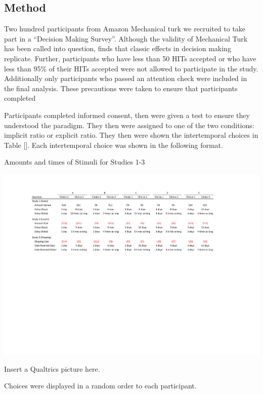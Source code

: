 \documentclass[]{article}
\begin{document}
\subsection{Method}
Two hundred participants from Amazon Mechanical turk we recruited to take part in a ``Decision Making Survey''. 
Although the validity of Mechanical Turk has been called into question,  finds that classic effects in decision making replicate. 
Further, participants who have less than 50 HITs accepted or  who have less than 95\% of their HITs accepted were not allowed to participate in the study. 
Additionally only participants who passed an attention check were included in the final analysis.
These precautions were taken to ensure that participants completed

Participants completed informed consent, then were given a test to ensure they understood the paradigm.
They then were assigned to one of the two conditions: implicit ratio or explicit ratio. 
They then were shown the intertemporal choices in Table []. 
Each intertemporal choice was shown in the following format.

\begin{landscape}
\begin{table}[!ht]
	\caption{Amounts and times of Stimuli for Studies 1-3} \label{tab:stimuli}
	\includegraphics[]{Stimuli_For_Study.pdf}
\end{table}
\end{landscape}

Insert a Qualtrics picture here. 

Choices were displayed in a random order to each participant. 
\end{document}
